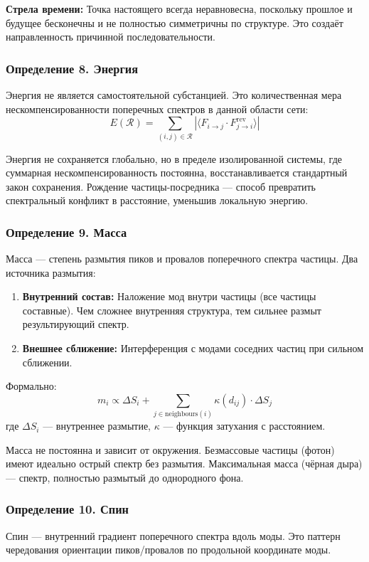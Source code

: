 \documentclass[12pt,a4paper]{article}
\begin{document}
\textbf{Стрела времени:} Точка настоящего всегда неравновесна, поскольку прошлое и будущее бесконечны и не полностью симметричны по структуре. Это создаёт направленность причинной последовательности.

\subsubsection{Определение 8. Энергия}
Энергия не является самостоятельной субстанцией. Это количественная мера нескомпенсированности поперечных спектров в данной области сети:
\begin{equation}
    E(\mathcal{R}) = \sum_{(i,j) \in \mathcal{R}} \left| \langle F_{i \to j} \cdot F_{j \to i}^{\text{rev}} \rangle \right|
\end{equation}

Энергия не сохраняется глобально, но в пределе изолированной системы, где суммарная нескомпенсированность постоянна, восстанавливается стандартный закон сохранения. Рождение частицы-посредника --- способ превратить спектральный конфликт в расстояние, уменьшив локальную энергию.

\subsubsection{Определение 9. Масса}
Масса --- степень размытия пиков и провалов поперечного спектра частицы. Два источника размытия:
\begin{enumerate}[label=\arabic*.]
    \item \textbf{Внутренний состав:} Наложение мод внутри частицы (все частицы составные). Чем сложнее внутренняя структура, тем сильнее размыт результирующий спектр.
    \item \textbf{Внешнее сближение:} Интерференция с модами соседних частиц при сильном сближении.
\end{enumerate}

Формально:
\begin{equation}
    m_i \propto \Delta S_i + \sum_{j \in \text{neighbours}(i)} \kappa(d_{ij}) \cdot \Delta S_j
\end{equation}
где $\Delta S_i$ --- внутреннее размытие, $\kappa$ --- функция затухания с расстоянием.

Масса не постоянна и зависит от окружения. Безмассовые частицы (фотон) имеют идеально острый спектр без размытия. Максимальная масса (чёрная дыра) --- спектр, полностью размытый до однородного фона.

\subsubsection{Определение 10. Спин}
Спин --- внутренний градиент поперечного спектра вдоль моды. Это паттерн чередования ориентации пиков/провалов по продольной координате моды.
\end{document}

